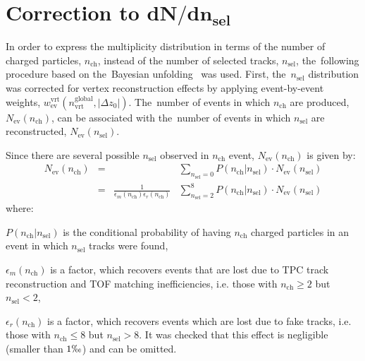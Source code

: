 \section[Correction to $dN/dn_\textrm{sel}$]{Correction to $\mathbf{dN/dn_\textrm{sel}}$}\label{section:star_dNdnch}
In order to express the multiplicity distribution in terms of the number of charged particles, $n_\textrm{ch}$, instead of the number of selected tracks, $n_\textrm{sel}$, the~following procedure based on the~Bayesian unfolding~\cite{unfolding:2016mok,unfolding:DAgostini} was used. First, the~$n_\textrm{sel}$ distribution was corrected for vertex reconstruction effects by applying event-by-event weights, $w_\textrm{ev}^\textrm{vrt}(n_\textrm{vrt}^\textrm{global},|\Delta z_0|)$. The~number of events in which $n_\textrm{ch}$ are produced, $N_\textrm{ev}(n_\textrm{ch})$, can be associated with the~number of events in which $n_\textrm{sel}$ are reconstructed, $N_\textrm{ev}(n_\textrm{sel})$.

Since there are several possible $n_\textrm{sel}$ observed in  $n_\textrm{ch}$ event,  $N_\textrm{ev}(n_\textrm{ch})$ is given by:
\begin{equation}
\begin{array}{ccccc}
N_\textrm{ev}(n_\textrm{ch})&=&&\displaystyle\sum_{n_\textrm{sel}=0}P(n_\textrm{ch}|n_\textrm{sel})\cdot N_\textrm{ev}(n_\textrm{sel})\\
&=&\displaystyle \frac{1}{\epsilon_{m}(n_\textrm{ch})\epsilon_{r}(n_\textrm{ch})}&\displaystyle\sum_{n_\textrm{sel}=2}^{8}P(n_\textrm{ch}|n_\textrm{sel})\cdot N_\textrm{ev}(n_\textrm{sel})
\end{array}
\end{equation}
where:
\begin{description}
	\item $P(n_\textrm{ch}|n_\textrm{sel})$ is the conditional probability of having $n_\textrm{ch}$ charged particles in an event in which  $n_\textrm{sel}$ tracks were found,
	\item $\epsilon_{m}(n_\textrm{ch})$ is a factor, which recovers events that are lost due to TPC track reconstruction and  TOF matching inefficiencies, i.e. those with $n_\textrm{ch}\geq2$ but $n_\textrm{sel}<2$,
	\item $\epsilon_{r}(n_\textrm{ch})$ is a factor, which recovers  events which are lost due to fake tracks, i.e. those with $n_\textrm{ch}\leq 8$ but $n_\textrm{sel}> 8$. It was checked that this effect is negligible (smaller than $1\permil$) and can be omitted. 
\end{description}
